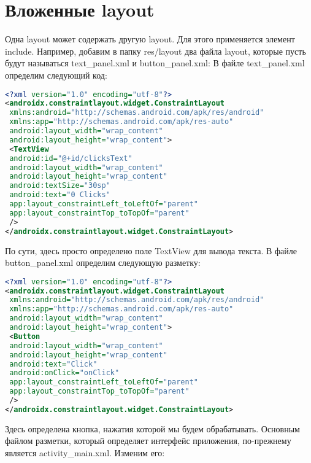 \section{Вложенные layout}
Одна layout может содержать другую layout. Для этого применяется элемент
include.
Например, добавим в папку res/layout два файла layout, которые пусть будут
называться text\_panel.xml и button\_panel.xml:
В файле text\_panel.xml определим следующий код:
\begin{lstlisting}[language=xml, caption=\leftline{xml}, label=lst:layout]
<?xml version="1.0" encoding="utf-8"?>
<androidx.constraintlayout.widget.ConstraintLayout
 xmlns:android="http://schemas.android.com/apk/res/android"
 xmlns:app="http://schemas.android.com/apk/res-auto"
 android:layout_width="wrap_content"
 android:layout_height="wrap_content">
 <TextView
 android:id="@+id/clicksText"
 android:layout_width="wrap_content"
 android:layout_height="wrap_content"
 android:textSize="30sp"
 android:text="0 Clicks"
 app:layout_constraintLeft_toLeftOf="parent"
 app:layout_constraintTop_toTopOf="parent"
 />
</androidx.constraintlayout.widget.ConstraintLayout>
\end{lstlisting}
По сути, здесь просто определено поле TextView для вывода текста.
В файле button\_panel.xml определим следующую разметку:
\begin{lstlisting}[language=xml, caption=\leftline{xml}, label=lst:button_panel.xml]
<?xml version="1.0" encoding="utf-8"?>
<androidx.constraintlayout.widget.ConstraintLayout
 xmlns:android="http://schemas.android.com/apk/res/android"
 xmlns:app="http://schemas.android.com/apk/res-auto"
 android:layout_width="wrap_content"
 android:layout_height="wrap_content">
 <Button
 android:layout_width="wrap_content"
 android:layout_height="wrap_content"
 android:text="Click"
 android:onClick="onClick"
 app:layout_constraintLeft_toLeftOf="parent"
 app:layout_constraintTop_toTopOf="parent"
 />
</androidx.constraintlayout.widget.ConstraintLayout>
\end{lstlisting}
Здесь определена кнопка, нажатия которой мы будем обрабатывать.
Основным файлом разметки, который определяет интерфейс приложения,
по-прежнему является activity\_main.xml. Изменим его:
